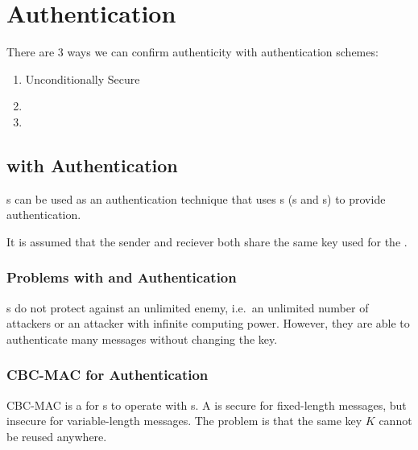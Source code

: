\section{Authentication}\label{sec:Authentication}
There are 3 ways we can confirm authenticity with authentication schemes:
\begin{enumerate}[noitemsep]
\item Unconditionally Secure 
\item {}
\item {}
\end{enumerate}

\subsection{ with Authentication}\label{subsec:MAC_Authentication}
s can be used as an authentication technique that uses s (s and s) to provide authentication.

\begin{remark*}
  It is assumed that the sender and reciever both share the same key used for the .
\end{remark*}

\subsubsection{Problems with  and Authentication}\label{subsubsec:MAC_Problems_Authentication}
s do not protect against an unlimited enemy, i.e.\ an unlimited number of attackers or an attacker with infinite computing power.
However, they are able to authenticate many messages without changing the key.

\subsubsection{CBC-MAC for Authentication}\label{subsubsec:CBC_MAC_Authentication}
CBC-MAC is a  for s to operate with s.
A  is secure for fixed-length messages, but insecure for variable-length messages.
The problem is that the same key $K$ cannot be reused anywhere.

